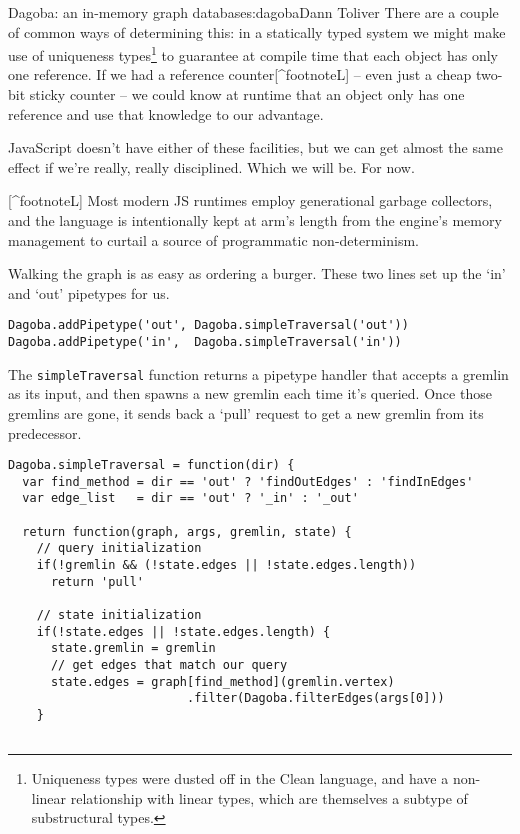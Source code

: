 \begin{aosachapter}{Dagoba: an in-memory graph database}{s:dagoba}{Dann Toliver}
There are a couple of common ways of determining this: in a statically
typed system we might make use of uniqueness types\footnote{Uniqueness
  types were dusted off in the Clean language, and have a non-linear
  relationship with linear types, which are themselves a subtype of
  substructural types.} to guarantee at compile time that each object
has only one reference. If we had a reference counter{[}\^{}footnoteL{]}
-- even just a cheap two-bit sticky counter -- we could know at runtime
that an object only has one reference and use that knowledge to our
advantage.

JavaScript doesn't have either of these facilities, but we can get
almost the same effect if we're really, really disciplined. Which we
will be. For now.

{[}\^{}footnoteL{]} Most modern JS runtimes employ generational garbage
collectors, and the language is intentionally kept at arm's length from
the engine's memory management to curtail a source of programmatic
non-determinism.

\label{in-n-out}

Walking the graph is as easy as ordering a burger. These two lines set
up the `in' and `out' pipetypes for us.

\begin{verbatim}
Dagoba.addPipetype('out', Dagoba.simpleTraversal('out'))
Dagoba.addPipetype('in',  Dagoba.simpleTraversal('in'))
\end{verbatim}

The \texttt{simpleTraversal} function returns a pipetype handler that
accepts a gremlin as its input, and then spawns a new gremlin each time
it's queried. Once those gremlins are gone, it sends back a `pull'
request to get a new gremlin from its predecessor.

\begin{verbatim}
Dagoba.simpleTraversal = function(dir) {
  var find_method = dir == 'out' ? 'findOutEdges' : 'findInEdges'
  var edge_list   = dir == 'out' ? '_in' : '_out'
  
  return function(graph, args, gremlin, state) {
    // query initialization
    if(!gremlin && (!state.edges || !state.edges.length))         
      return 'pull'
      
    // state initialization
    if(!state.edges || !state.edges.length) {                     
      state.gremlin = gremlin
      // get edges that match our query
      state.edges = graph[find_method](gremlin.vertex)            
                         .filter(Dagoba.filterEdges(args[0]))
    }


\end{verbatim}
\end{aosachapter}
